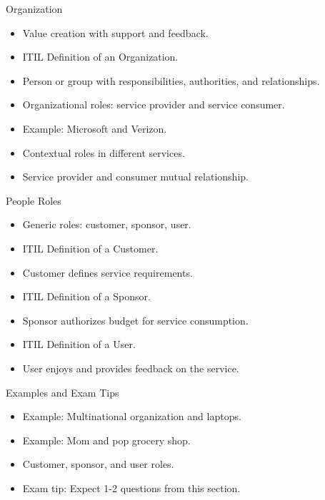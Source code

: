 \documentclass[aspectratio=169, table]{beamer}
\begin{document}
\begin{frame}{Organization}
	\begin{itemize}
		\item Value creation with support and feedback.
		\item ITIL Definition of an Organization.
		\item Person or group with responsibilities, authorities, and relationships.
		\item Organizational roles: service provider and service consumer.
		\item Example: Microsoft and Verizon.
		\item Contextual roles in different services.
		\item Service provider and consumer mutual relationship.
	\end{itemize}
\end{frame}

\begin{frame}{People Roles}
	\begin{itemize}
		\item Generic roles: customer, sponsor, user.
		\item ITIL Definition of a Customer.
		\item Customer defines service requirements.
		\item ITIL Definition of a Sponsor.
		\item Sponsor authorizes budget for service consumption.
		\item ITIL Definition of a User.
		\item User enjoys and provides feedback on the service.
	\end{itemize}
\end{frame}

\begin{frame}{Examples and Exam Tips}
	\begin{itemize}
		\item Example: Multinational organization and laptops.
		\item Example: Mom and pop grocery shop.
		\item Customer, sponsor, and user roles.
		\item Exam tip: Expect 1-2 questions from this section.
	\end{itemize}
\end{frame}
\end{document}
